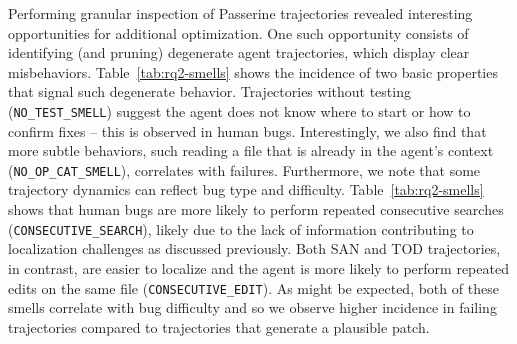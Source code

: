 Performing granular inspection of Passerine
trajectories revealed interesting opportunities for additional
optimization. One such opportunity consists of identifying
(and pruning) degenerate agent trajectories, which display
clear misbehaviors. Table~\ref{tab:rq2-smells} shows 
the incidence of two basic properties that signal such
degenerate behavior. 
Trajectories without testing (\texttt{NO\_TEST\_SMELL}) suggest the agent does not
know where to start or how to confirm fixes -- this is observed in 
human bugs.
Interestingly, we also find that more subtle behaviors,
such reading a file that is already in the agent's
context (\texttt{NO\_OP\_CAT\_SMELL}), correlates with failures.
Furthermore, we note that some trajectory dynamics can reflect bug type and difficulty.
Table~\ref{tab:rq2-smells} shows that human bugs are more likely to perform
repeated consecutive searches (\texttt{CONSECUTIVE\_SEARCH}), likely due to
the lack of information contributing to localization challenges as discussed
previously. Both SAN and TOD trajectories, in contrast, are easier to localize
and the agent is more likely to perform repeated edits on the same file (\texttt{CONSECUTIVE\_EDIT}). As might be expected, both of these smells correlate
with bug difficulty and so we observe higher incidence in failing trajectories compared
to trajectories that generate a plausible patch. %



\vspace{-0.2cm}
\begin{center} 
\end{center}




